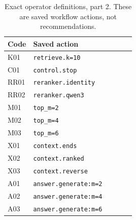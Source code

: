 \begin{table}[p]
\centering
\small
\setlength{\tabcolsep}{4pt}
\caption{Exact operator definitions, part 2. These are saved workflow actions, not recommendations.}
\label{tab:rag-operator-dictionary-2}
\begin{tabular}{@{}lp{0.80\linewidth}@{}}
\toprule
Code & Saved action \\
\midrule
K01 & \texttt{retrieve.\allowbreak{}k=\allowbreak{}10} \\
C01 & \texttt{control.\allowbreak{}stop} \\
RR01 & \texttt{reranker.\allowbreak{}identity} \\
RR02 & \texttt{reranker.\allowbreak{}qwen3} \\
M01 & \texttt{top\_m=\allowbreak{}2} \\
M02 & \texttt{top\_m=\allowbreak{}4} \\
M03 & \texttt{top\_m=\allowbreak{}6} \\
X01 & \texttt{context.\allowbreak{}ends} \\
X02 & \texttt{context.\allowbreak{}ranked} \\
X03 & \texttt{context.\allowbreak{}reverse} \\
A01 & \texttt{answer.\allowbreak{}generate:\allowbreak{}m=\allowbreak{}2} \\
A02 & \texttt{answer.\allowbreak{}generate:\allowbreak{}m=\allowbreak{}4} \\
A03 & \texttt{answer.\allowbreak{}generate:\allowbreak{}m=\allowbreak{}6} \\
\bottomrule
\end{tabular}
\end{table}
